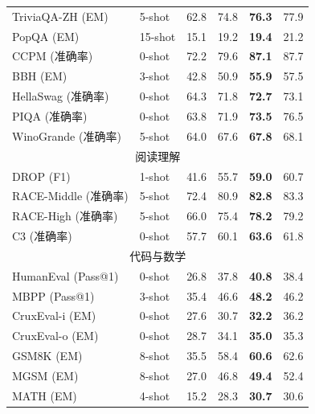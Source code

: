 \begin{longtable}{p{}lrrrr}
 TriviaQA-ZH {(EM)} & 5-shot & 62.8 & 74.8 & \textbf{76.3} & 77.9 \\
 PopQA {(EM)} & 15-shot & 15.1 & 19.2 & \textbf{19.4} & 21.2 \\
 CCPM {(准确率)} & 0-shot & 72.2 & 79.6 & \textbf{87.1} &  87.7 \\
 BBH {(EM)} & 3-shot & 42.8 & 50.9 & \textbf{55.9} &  57.5 \\
 HellaSwag {(准确率)} & 0-shot & 64.3 & 71.8 & \textbf{72.7} & 73.1 \\
 PIQA {(准确率)} & 0-shot & 63.8 & 71.9 & \textbf{73.5} &  76.5 \\
 WinoGrande {(准确率)} & 5-shot & 64.0 & 67.6 & \textbf{67.8} &  68.1 \\
 \midrule
\multicolumn{6}{c}{阅读理解}\\
DROP {(F1)} & 1-shot & 41.6 & 55.7 & \textbf{59.0} & 60.7 \\
 RACE-Middle {(准确率)} & 5-shot & 72.4 & 80.9 & \textbf{82.8} & 83.3 \\
 RACE-High {(准确率)} & 5-shot & 66.0 & 75.4 & \textbf{78.2} & 79.2 \\
 C3 {(准确率)} & 0-shot & 57.7 & 60.1 & \textbf{63.6} &  61.8 \\
 \midrule
\multicolumn{6}{c}{代码与数学}\\
HumanEval {(Pass@1)} & 0-shot & 26.8 & 37.8 & \textbf{40.8} & 38.4  \\
 MBPP {(Pass@1)} & 3-shot & 35.4 & 46.6 & \textbf{48.2} & 46.2 \\
 CruxEval-i {(EM)} & 0-shot &27.6&30.7 & \textbf{32.2} & 36.2 \\
 CruxEval-o {(EM)} & 0-shot &28.7&34.1 & \textbf{35.0} & 35.3 \\
 GSM8K {(EM)} & 8-shot & 35.5 & 58.4 & \textbf{60.6} & 62.6 \\
 MGSM {(EM)} & 8-shot & 27.0 & 46.8 & \textbf{49.4} &  52.4 \\
 MATH {(EM)} & 4-shot & 15.2 & 28.3 & \textbf{30.7} & 30.6 \\
\bottomrule
\end{longtable}
\endgroup
